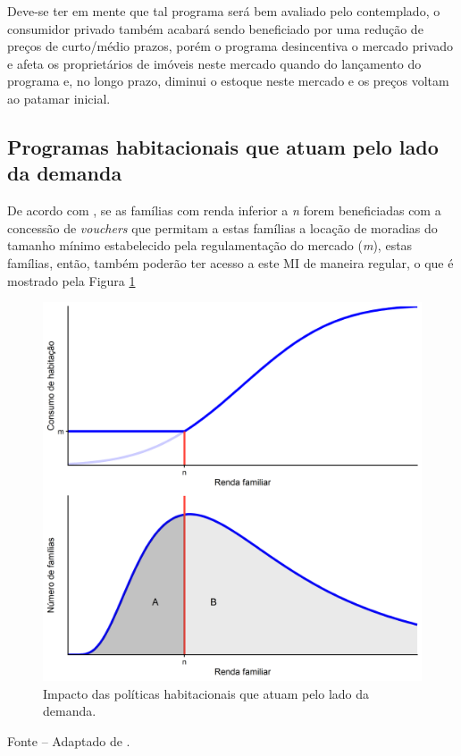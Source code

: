 \documentclass[
	12pt,				%
	oneside,			%
	a4paper,			%
	chapter=TITLE,		%
	section=TITLE,		%
	english,			%
	brazil				%
	]{abntex2}
\newcommand{\bcenter}{\begin{center}}
\newcommand{\ecenter}{\end{center}}
\begin{document}
\begin{refsection}
Deve-se ter em mente que tal programa será bem avaliado pelo contemplado, o
consumidor privado também acabará sendo beneficiado por uma redução de preços de
curto/médio prazos, porém o programa desincentiva o mercado privado e afeta os
proprietários de imóveis neste mercado quando do lançamento do programa e, no
longo prazo, diminui o estoque neste mercado e os preços voltam ao patamar
inicial.

\hypertarget{programas-habitacionais-que-atuam-pelo-lado-da-demanda}{%
\subsection{Programas habitacionais que atuam pelo lado da demanda}\label{programas-habitacionais-que-atuam-pelo-lado-da-demanda}}

De acordo com \textcite[p.~260]{bertaud}, se as famílias com renda inferior a \emph{n} forem
beneficiadas com a concessão de \emph{vouchers} que permitam a estas famílias a
locação de moradias do tamanho mínimo estabelecido pela regulamentação do
mercado (\emph{m}), estas famílias, então, também poderão ter acesso a este \gls{MI}
de maneira regular, o que é mostrado pela Figura \ref{fig:vouchers}
\begin{figure}[H]

{\centering \includegraphics[width=0.7\linewidth]{images/vouchers-1} 

}

\caption{Impacto das políticas habitacionais que atuam pelo lado da demanda.}\label{fig:vouchers}
\end{figure}
\bcenter

\small Fonte -- Adaptado de \textcite[p.~260]{bertaud}.
\ecenter


\end{refsection}
\end{document}
